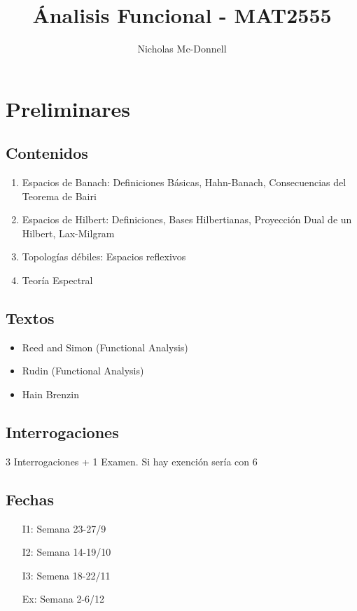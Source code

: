 \documentclass{notetaking}
\title{Ánalisis Funcional - MAT2555}
\author{Nicholas Mc-Donnell}
\date{}
\begin{document}
\maketitle
\tableofcontents
\newpage

\section*{Preliminares}

\subsection*{Contenidos}
\begin{enumerate}
    \item Espacios de Banach: Definiciones Básicas, Hahn-Banach, Consecuencias del Teorema de Bairi
    \item Espacios de Hilbert: Definiciones, Bases Hilbertianas, Proyección Dual de un Hilbert, Lax-Milgram
    \item Topologías débiles: Espacios reflexivos
    \item Teoría Espectral
\end{enumerate}

\subsection*{Textos}
\begin{itemize}
    \item Reed and Simon (Functional Analysis)
    \item Rudin (Functional Analysis)
    \item Hain Brenzin
\end{itemize}

\subsection*{Interrogaciones}
3 Interrogaciones + 1 Examen. Si hay exención sería con 6

\subsection*{Fechas}
\begin{itemize}
    \item[I1:] Semana 23-27/9
    \item[I2:] Semana 14-19/10
    \item[I3:] Semena 18-22/11
    \item[Ex:] Semana 2-6/12
\end{itemize}
\newpage
\end{document}
